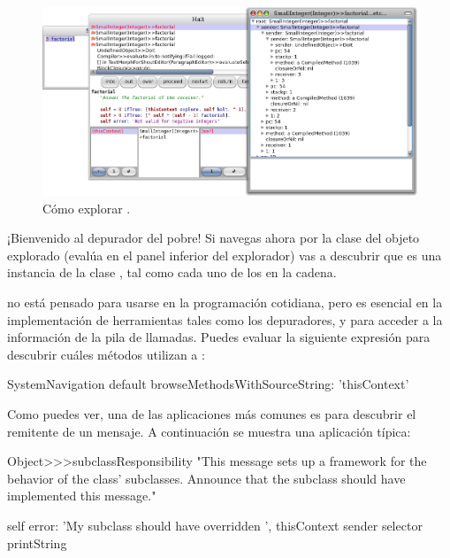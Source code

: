 \documentclass[a4paper,10pt,twoside]{book}
\begin{document}

\begin{figure}[ht]\centering
        \includegraphics[width=\linewidth]{exploringThisContext}
        \caption{ Cómo explorar
          .}
\end{figure}

¡Bienvenido al depurador del pobre!
Si navegas ahora por la clase del objeto explorado (evalúa 
en el panel inferior del explorador) vas a descubrir que es
una instancia de la clase , tal como cada uno de
los  en la cadena.


 no está pensado para usarse en la programación
cotidiana, pero es esencial en la implementación de herramientas tales
como los depuradores, y para acceder a la información de la pila de
llamadas.  Puedes evaluar la siguiente expresión para descubrir cuáles
métodos utilizan a :

\begin{code}{}
SystemNavigation default browseMethodsWithSourceString: 'thisContext'
\end{code}

Como puedes ver, una de las aplicaciones más comunes es para descubrir
el remitente de un mensaje.  A continuación se muestra una aplicación
típica:
\begin{code}{}
Object>>>subclassResponsibility
        "This message sets up a framework for the behavior of the class' subclasses.
        Announce that the subclass should have implemented this message."

        self error: 'My subclass should have overridden ', thisContext sender selector printString
\end{code}
\end{document}
